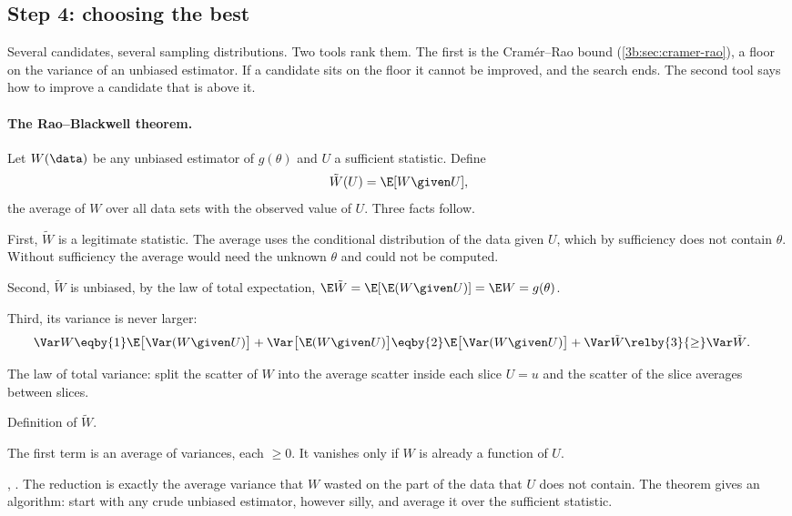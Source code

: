 \subsection{Step 4: choosing the best}
\label{3b:sec:recipe-best}

Several candidates, several sampling distributions. Two tools rank them.
The first is the Cram\'er--Rao bound (\cref{3b:sec:cramer-rao}), a floor on
the variance of an unbiased estimator. If a candidate sits on the floor it
cannot be improved, and the search ends. The second tool says how to
improve a candidate that is above it.

\paragraph{The Rao--Blackwell theorem.}
Let $W(\data)$ be any unbiased estimator of $g(\theta)$ and $U$ a sufficient
statistic. Define
\[
  \tilde W(U)=\E[W\given U] ,
\]
the average of $W$ over all data sets with the observed value of $U$.
Three facts follow.

First, $\tilde W$ is a legitimate statistic. The average uses the
conditional distribution of the data given $U$, which by sufficiency does not
contain $\theta$. Without sufficiency the average would need the unknown
$\theta$ and could not be computed.

Second, $\tilde W$ is unbiased, by the law of total expectation,
$\E\tilde W=\E[\E(W\given U)]=\E W=g(\theta)$.

Third, its variance is never larger:
\begin{align}
  \Var W
  &\eqby{1}\E\bigl[\Var(W\given U)\bigr]+\Var\bigl[\E(W\given U)\bigr]
   \eqby{2}\E\bigl[\Var(W\given U)\bigr]+\Var\tilde W
   \relby{3}{\ge}\Var\tilde W .
  \label{3b:eq:rao-blackwell}
\end{align}
\begin{explain}
  \item The law of total variance: split the scatter of $W$ into the average
        scatter inside each slice $U=u$ and the scatter of the slice
        averages between slices.
  \item Definition of $\tilde W$.
  \item The first term is an average of variances, each $\ge0$. It vanishes
        only if $W$ is already a function of $U$.
\end{explain}
, . The
reduction is exactly the average variance that $W$ wasted on the part of the
data that $U$ does not contain. The theorem gives an algorithm: start with
any crude unbiased estimator, however silly, and average it over the
sufficient statistic.

